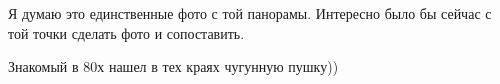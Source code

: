  
 
 
 
 

Я думаю это единственные фото с той панорамы. Интересно было бы сейчас с той точки сделать фото и сопоставить.

Знакомый в 80х нашел в тех краях чугунную пушку))
